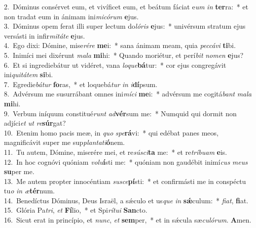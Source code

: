 {2.~}Dóminus consérvet eum, et vivíficet eum, et beátum fáciat e\textit{um} \textit{in} \textbf{ter}ra:~* et non tradat eum in ánimam ini\textit{mi}\textit{có}\textit{rum} \textbf{e}jus.\\
{3.~}Dóminus opem ferat illi super lectum do\textit{ló}\textit{ris} \textbf{e}jus:~* univérsum stratum ejus versásti in infir\textit{mi}\textit{tá}\textit{te} \textbf{e}jus.\\
{4.~}Ego dixi: Dómine, mise\textit{ré}\textit{re} \textbf{me}i:~* sana ánimam meam, quia \textit{pec}\textit{cá}\textit{vi} \textbf{ti}bi.\\
{5.~}Inimíci mei dixérunt \textit{ma}\textit{la} \textbf{mi}hi:~* Quando moriétur, et perí\textit{bit} \textit{no}\textit{men} \textbf{e}jus?\\
{6.~}Et si ingrediebátur ut vidéret, vana \textit{lo}\textit{que}\textbf{bá}tur:~* cor ejus congregávit ini\textit{qui}\textit{tá}\textit{tem} \textbf{si}bi.\\
{7.~}Egredie\textit{bá}\textit{tur} \textbf{fo}ras,~* et loquebá\textit{tur} \textit{in} \textit{i}\textbf{dí}psum.\\
{8.~}Advérsum me susurrábant omnes ini\textit{mí}\textit{ci} \textbf{me}i:~* advérsum me cogitá\textit{bant} \textit{ma}\textit{la} \textbf{mi}hi.\\
{9.~}Verbum iníquum constitué\textit{runt} \textit{ad}\textbf{vér}sum me:~* Numquid qui dormit non adjíci\textit{et} \textit{ut} \textit{re}\textbf{súr}gat?\\
{10.~}Etenim homo pacis meæ, in \textit{quo} \textit{spe}\textbf{rá}vi:~* qui edébat panes meos, magnificávit super me sup\textit{plan}\textit{ta}\textit{ti}\textbf{ó}nem.\\
{11.~}Tu autem, Dómine, miserére mei, et re\textit{sú}\textit{sci}\textbf{ta} me:~* et re\textit{trí}\textit{bu}\textit{am} \textbf{e}is.\\
{12.~}In hoc cognóvi quóniam \textit{vo}\textit{lu}\textbf{í}sti me:~* quóniam non gaudébit inimí\textit{cus} \textit{me}\textit{us} \textbf{su}per me.\\
{13.~}Me autem propter innocéntiam \textit{su}\textit{sce}\textbf{pí}sti:~* et confirmásti me in conspéctu tu\textit{o} \textit{in} \textit{æ}\textbf{tér}num.\\
{14.~}Benedíctus Dóminus, Deus Israël, a sǽculo et us\textit{que} \textit{in} \textbf{sǽ}culum:~* \textit{fi}\textit{at}, \textbf{fi}at.\\
{15.~}Glória Pa\textit{tri}, \textit{et} \textbf{Fí}lio,~* et Spi\textit{rí}\textit{tu}\textit{i} \textbf{San}cto.\\
{16.~}Sicut erat in princípio, et \textit{nunc}, \textit{et} \textbf{sem}per,~* et in sǽcula sæ\textit{cu}\textit{ló}\textit{rum}. \textbf{A}men.\\
